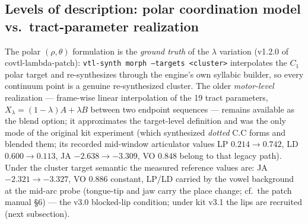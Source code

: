 \documentclass[11pt,a4paper]{article}
\begin{document}
\subsection{Levels of description: polar coordination model vs.\ tract-parameter realization}
The polar $(\rho, \theta)$ formulation is the \emph{ground truth} of the $\lambda$ variation (v1.2.0 of covtl-lambda-patch): \texttt{vtl-synth morph --targets <cluster>} interpolates the $C_1$ polar target and re-synthesizes through the engine's own syllabic builder, so every continuum point is a genuine re-synthesized cluster. The older \emph{motor-level} realization --- frame-wise linear interpolation of the 19 tract parameters, $X_\lambda = (1-\lambda)A + \lambda B$ between two endpoint sequences --- remains available as the blend option; it approximates the target-level definition and was the only mode of the original kit experiment (which synthesized \emph{dotted} C.C forms and blended them; its recorded mid-window articulator values LP $0.214 \to 0.742$, LD $0.600 \to 0.113$, JA $-2.638 \to -3.309$, VO $0.848$ belong to that legacy path). Under the cluster target semantic the measured reference values are: JA $-2.321 \to -3.327$, VO $0.886$ constant, LP/LD carried by the vowel background at the mid-arc probe (tongue-tip and jaw carry the place change; cf.\ the patch manual §6) --- the v3.0 blocked-lip condition; under kit v3.1 the lips are recruited (next subsection).
\end{document}
